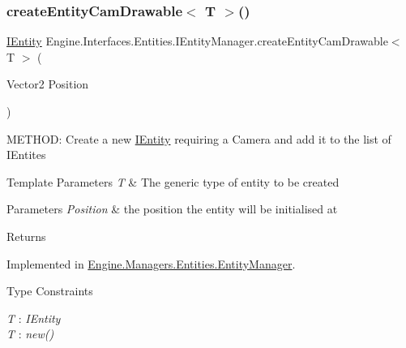\subsubsection{\texorpdfstring{create\+Entity\+Cam\+Drawable$<$ T $>$()}{createEntityCamDrawable< T >()}}
{\footnotesize\ttfamily \hyperlink{a00438}{I\+Entity} Engine.\+Interfaces.\+Entities.\+I\+Entity\+Manager.\+create\+Entity\+Cam\+Drawable$<$ T $>$ (\begin{DoxyParamCaption}\item[{Vector2}]{Position }\end{DoxyParamCaption})}



M\+E\+T\+H\+OD\+: Create a new \hyperlink{a00438}{I\+Entity} requiring a Camera and add it to the list of I\+Entites 


\begin{DoxyTemplParams}{Template Parameters}
{\em T} & The generic type of entity to be created\\
\hline
\end{DoxyTemplParams}

\begin{DoxyParams}{Parameters}
{\em Position} & the position the entity will be initialised at\\
\hline
\end{DoxyParams}
\begin{DoxyReturn}{Returns}

\end{DoxyReturn}


Implemented in \hyperlink{a00518_a89ca1b1834aff0dc1d2c6ec95dcd0793}{Engine.\+Managers.\+Entities.\+Entity\+Manager}.

\begin{Desc}
\item[Type Constraints]\begin{description}
\item[{\em T} : {\em I\+Entity}]\item[{\em T} : {\em new()}]\end{description}
\end{Desc}
\mbox{\label{a00442_a36f4ce84282acb366896ebec20677cce}} 
